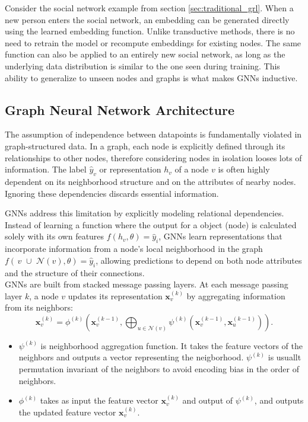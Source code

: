 Consider the social network example from section \ref{sec:traditional_grl}. When a new person enters the social network, an embedding can be generated directly using the learned embedding function. Unlike transductive methods, there is no need to retrain the model or recompute embeddings for existing nodes. The same function can also be applied to an entirely new social network, as long as the underlying data distribution is similar to the one seen during training. This ability to generalize to unseen nodes and graphs is what makes GNNs inductive.



\subsection{Graph Neural Network Architecture}\label{sec:gnn_arch}


The assumption of independence between datapoints is fundamentally violated in graph-structured data. In a graph, each node is explicitly defined through its relationships to other nodes, therefore considering nodes in isolation looses lots of information. The label $\hat{y}_v$ or representation $h_v$ of a node $v$ is often highly dependent on its neighborhood structure and on the attributes of nearby nodes. Ignoring these dependencies discards essential information.

GNNs address this limitation by explicitly modeling relational dependencies. Instead of learning a function where the output for a object (node) is calculated solely with its own features $f(h_v, \theta) = \hat{y}_i$, GNNs learn representations that incorporate information from a node’s local neighborhood in the graph $f(\,v \,\, \cup \,\, \mathcal{N}(v), \theta) = \hat{y}_i$, allowing predictions to depend on both node attributes and the structure of their connections.\\


\noindent GNNs are built from stacked message passing layers. At each message passing layer $k$, a node $v$ updates its representation $\mathbf{x}_v^{(k)}$ by aggregating information from its neighbors:
\[
\mathbf{x}_v^{(k)} =
\phi^{(k)}\!\left(
\mathbf{x}_v^{(k-1)},
\bigoplus_{u \in \mathcal{N}(v)}
\psi^{(k)}\!\left(\mathbf{x}_v^{(k-1)}, \mathbf{x}_u^{(k-1)}\right)
\right).
\]

\begin{itemize}
    \item $\psi^{(k)}$ is neighborhood aggregation function. It takes the feature vectors of the neighbors and outputs a vector representing the neigborhood. $\psi^{(k)}$ is usuallt permutation invariant of the neighbors to avoid encoding bias in the order of neighbors.
    \item $\phi^{(k)}$ takes as input the feature vector $\mathbf{x}_v^{(k)}$ and output of $\psi^{(k)}$, and outputs the updated feature vector $\mathbf{x}_v^{(k)}$.
\end{itemize}

